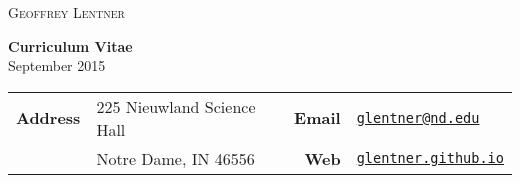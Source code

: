 
\begin{multicols}{2}[]

\huge
\textsc{Geoffrey Lentner}

\normalsize
\begin{flushright}
\textbf{Curriculum Vitae}\\
September 2015
\end{flushright}

\end{multicols}











\bigskip
\normalsize
\begin{tabular}{rlrl}
\textbf{Address} & 225 Nieuwland Science Hall & \textbf{Email} & 
					\href{mailto:glentner@nd.edu}{\small\texttt{{glentner@nd.edu}}} \\

                 & Notre Dame, IN 46556       & \textbf{Web}   & 
				 	\href{http://glentner.github.io}{\small\texttt{{glentner.github.io}}}
\end{tabular}



\smallskip
\noindent\makebox[\linewidth]{\rule{\textwidth}{0.4pt}}

